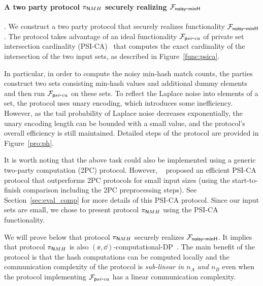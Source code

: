 \paragraph{A two party protocol $\pi_{\mathsf NMH}$ securely realizing ${\mathcal{F}_\mathsf{noisy\mbox{-}minH}}$}. 
We construct a two party protocol that securely realizes functionality
${\mathcal{F}_\mathsf{noisy\mbox{-}minH}}$. The protocol takes advantage of an ideal functionality $\mathcal{F}_{{\mathsf psi\mbox{-}ca}}$ of private set intersection cardinality (PSI-CA)~\cite{DGT12} that computes the exact cardinality of the intersection of the two input sets, as described in Figure~\ref{func:psica}. 


In particular, in order to compute the noisy min-hash match counts, the parties
construct two sets consisting min-hash values and additional dummy elements and
then run $\mathcal{F}_{{\mathsf psi\mbox{-}ca}}$ on these sets. To reflect the Laplace noise into elements
of a set, the protocol uses unary encoding, which introduces some inefficiency.
However, as the tail probability of Laplace noise decreases exponentially, the
unary encoding length can be bounded with a small value, and the protocol's
overall efficiency is still maintained. Detailed steps of the protocol are
provided in Figure~\ref{pro:ph}.

It is worth noting that the above task could also be implemented using a generic
two-party computation (2PC) protocol. However, ~\cite{DGT12}
proposed an efficient PSI-CA protocol that outperforms 2PC protocols for small
input sizes (using the start-to-finish comparison including the 2PC preprocessing steps). See Section~\ref{sec:eval_comp} for more details of this PSI-CA protocol. Since our input sets are small, we chose to
present protocol $\pi_{\mathsf NMH}$ using the PSI-CA functionality.

We will prove below that protocol $\pi_{\mathsf NMH}$ securely realizes ${\mathcal{F}_\mathsf{noisy\mbox{-}minH}}$. It implies that protocol $\pi_{\mathsf NMH}$ is also $(\ee,
\dd)$-computational-DP~\cite{SCRS17}. The main benefit of the protocol is that the hash
computations can be computed locally and the communication complexity of the
protocol is {\em sub-linear in $n_A$ and $n_B$} even when the protocol implementing $\mathcal{F}_{{\mathsf psi\mbox{-}ca}}$ has a linear communication complexity. 





